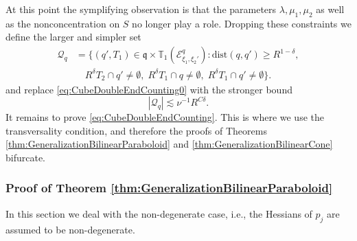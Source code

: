 \documentclass{amsart}
\theoremstyle{definition}
\newcommand{\T}{\mathbb{T}}
\begin{document}
\medskip

At this point the symplifying observation is that 
the parameters $\lambda,\mu_1,\mu_2$ as well as the nonconcentration on $S$ no longer play a role. Dropping 
these constraints we define the larger and simpler set 
\begin{equation*}
\begin{split}
\mathcal{Q}_{q} &= \{ (q',T_1) \in \mathfrak{q} \times \T_1(\mathcal{E}^{q}_{\xi_1,\xi_2'}) : \text{dist}(q,q') \geq R^{1-\delta},   \\
&\quad R^{\delta} T_{2} \cap  q' \neq \emptyset, \; R^{\delta} T_1 \cap q \neq \emptyset, \; R^{\delta}  T_1 \cap q' \neq \emptyset \}.
\end{split}
\end{equation*}
and replace \eqref{eq:CubeDoubleEndCounting0} with the stronger bound
\begin{equation}
\label{eq:CubeDoubleEndCounting}
|\mathcal{Q}_{q}| \lesssim \nu^{-1} R^{C \delta}.
\end{equation}
It remains to prove \eqref{eq:CubeDoubleEndCounting}. This is where we use the transversality condition, and therefore the proofs of Theorems \ref{thm:GeneralizationBilinearParaboloid} and \ref{thm:GeneralizationBilinearCone} bifurcate.

\subsubsection{Proof of Theorem \ref{thm:GeneralizationBilinearParaboloid}}
In this section we deal with the non-degenerate case, i.e., the Hessians of $p_j$ are assumed to be non-degenerate.
\end{document}

